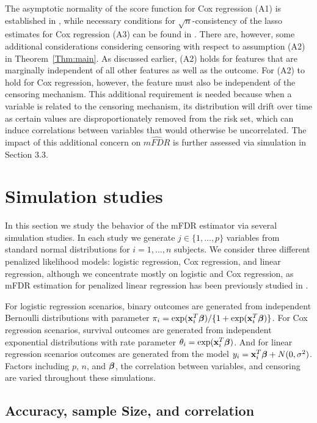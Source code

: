 The asymptotic normality of the score function for Cox regression (A1) is established in \citet{Andersen1982}, while necessary conditions for $\sqrt{n}$-consistency of the lasso estimates for Cox regression (A3) can be found in \citet{Fan_scad}.  There are, however, some additional considerations considering censoring with respect to assumption (A2) in Theorem~\ref{Thm:main}.  As discussed earlier, (A2) holds for features that are marginally independent of all other features as well as the outcome.  For (A2) to hold for Cox regression, however, the feature must also be independent of the censoring mechanism.  This additional requirement is needed because when a variable is related to the censoring mechanism, its distribution will drift over time as certain values are disproportionately removed from the risk set, which can induce correlations between variables that would otherwise be uncorrelated. The impact of this additional concern on $\widehat{mFDR}$ is further assessed via simulation in Section 3.3. 

\section{Simulation studies}

In this section we study the behavior of the mFDR estimator via several simulation studies. In each study we generate $j \in \{1, \ldots, p\}$ variables from standard normal distributions for $i = 1, \ldots, n$ subjects. We consider three different penalized likelihood models: logistic regression, Cox regression, and linear regression, although we concentrate mostly on logistic and Cox regression, as mFDR estimation for penalized linear regression has been previously studied in \citet{Breheny2017}.

For logistic regression scenarios, binary outcomes are generated from independent Bernoulli distributions with parameter $\pi_i = \exp(\mathbf{x}_i^T \boldsymbol{\beta})/\{1 + \exp(\mathbf{x}_i^T \boldsymbol{\beta})\}$. For Cox regression scenarios, survival outcomes are generated from independent exponential distributions with rate parameter $\theta_i = \exp(\mathbf{x}_i^T \boldsymbol{\beta})$. And for linear regression scenarios outcomes are generated from the model $y_i = \mathbf{x}_i^T\boldsymbol{\beta} + N(0,\sigma^2)$. Factors including $p$, $n$, and $\boldsymbol{\beta}$, the correlation between variables, and censoring are varied throughout these simulations.

\subsection{Accuracy, sample Size, and correlation}
\label{Sec:accuracy}


